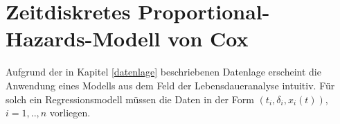 \section{Zeitdiskretes Proportional-Hazards-Modell von Cox}

Aufgrund der  in Kapitel \ref{datenlage} beschriebenen Datenlage erscheint die Anwendung eines Modells aus dem Feld der Lebensdaueranalyse intuitiv. Für solch ein Regressionsmodell müssen die Daten in der Form $(t_i, \delta_i, x_i(t))$, $i = 1,..,n$ vorliegen.  